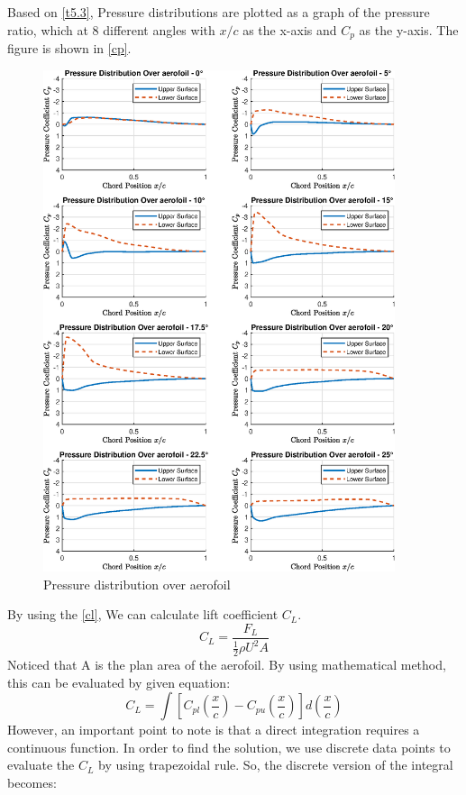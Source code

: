 Based on \autoref{t5.3}, Pressure distributions are plotted as a graph of the pressure ratio, which at 8 different angles with $x/c$ as the x-axis and $C_p$ as the y-axis. The figure is shown in \autoref{cp}.
\begin{figure}[htbp]
    \centering
    \includegraphics[width=0.92\textwidth]{output.eps}
    \caption{Pressure distribution over aerofoil}
    \label{cp}
  \end{figure}
By using the \autoref{cl}, We can calculate lift coefficient $C_L$.
\begin{equation}
    \label{cl}
C_{L}={\frac{F_{L}}{{\frac{1}{2}}\rho U^{2}A}}
\end{equation}
Noticed that A is the plan area of the aerofoil. By using mathematical method, this can be evaluated by given equation:
$$
C_{L}=\int\left[C_{p l}\left(\frac{x}{c}\right)-C_{p u}\left(\frac{x}{c}\right)\right]d\left(\frac{x}{c}\right)
$$
However, an important point to note is that a direct integration requires a continuous function. In order to find the solution, we use discrete data points to evaluate the $C_L$ by using trapezoidal rule. So, the discrete version of the integral becomes:
